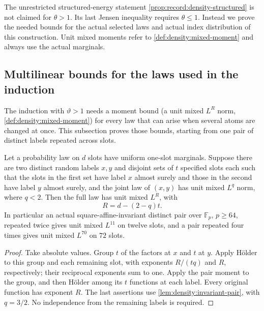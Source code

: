 The unrestricted structured-energy statement
\cref{prop:record:density-structured} is not claimed for $\theta>1$.
Its last Jensen inequality requires $\theta\le1$. Instead we prove the
needed bounds for the actual selected laws and actual index distribution
of this construction. Unit mixed moments refer to
\cref{def:density:mixed-moment} and always use the actual marginals.

\subsection{Multilinear bounds for the laws used in the induction}

The induction with $\vartheta>1$ needs a moment bound (a unit mixed
$L^R$ norm, \cref{def:density:mixed-moment}) for every law that can
arise when several atoms are changed at once. This subsection
proves those bounds, starting from one pair of distinct labels
repeated across slots.

\begin{lemma}\label{lem:density:repeated-pair}
Let a probability law on $d$ slots have uniform one-slot marginals.
Suppose there are two distinct random labels $x,y$ and disjoint sets of $t$ specified slots each such that the slots in the first set have label $x$ almost surely and those in the second have label $y$ almost surely, and the joint law of $(x,y)$ has unit mixed $L^q$ norm, where $q<2$.
Then the full law has unit mixed $L^R$, with
\[
 R=d-(2-q)t.
\]
In particular an actual square-affine-invariant distinct pair over
$\mathbb F_p$, $p\ge64$, repeated twice gives unit mixed $L^{11}$
on twelve slots, and a pair repeated four times gives unit mixed
$L^{70}$ on $72$ slots.
\end{lemma}

\begin{proof}
Take absolute values. Group $t$ of the factors at $x$ and $t$ at $y$.
Apply H\"older to this group and each remaining slot, with exponents
$R/(tq)$ and $R$, respectively; their reciprocal exponents sum to one.
Apply the pair moment to the group, and then H\"older among its $t$
functions at each label. Every original function has exponent $R$.
The last assertions use \cref{lem:density:invariant-pair}, with $q=3/2$.
No independence from the remaining labels is required.
\end{proof}

